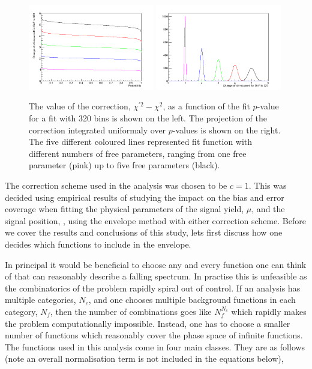 \begin{figure}
  \begin{center}
    \includegraphics[width=0.49\textwidth]{analysis/plots/ChisqConv1.png}
    \includegraphics[width=0.49\textwidth]{analysis/plots/ChisqConv2.png}
    \caption{The value of the correction, $\chi^{\prime 2} - \chi^{2}$, as a function of the fit $p$-value for a fit with 320 bins is shown on the left. The projection of the correction integrated uniformaly over $p$-values is shown on the right. The five different coloured lines represented fit function with different numbers of free parameters, ranging from one free parameter (pink) up to five free parameters (black).}
    \label{fig:envelope_chi2_correction}
  \end{center}
\end{figure}

The correction scheme used in the analysis was chosen to be $c=1$. This was decided using empirical results of studying the impact on the bias and error coverage when fitting the physical parameters of the signal yield, $\mu$, and the signal position, \mH, using the envelope method with either correction scheme. Before we cover the results and conclusions of this study, lets first discuss how one decides which functions to include in the envelope.

In principal it would be beneficial to choose any and every function one can think of that can reasonably describe a falling spectrum. In practise this is unfeasible as the combinatorics of the problem rapidly spiral out of control. If an analysis has multiple categories, $N_{c}$, and one chooses multiple background functions in each category, $N_{f}$, then the number of combinations goes like $N_{f}^{N_{c}}$ which rapidly makes the problem computationally impossible. Instead, one has to choose a smaller number of functions which reasonably cover the phase space of infinite functions. The functions used in this analysis come in four main classes. They are as follows (note an overall normalisation term is not included in the equations below),

